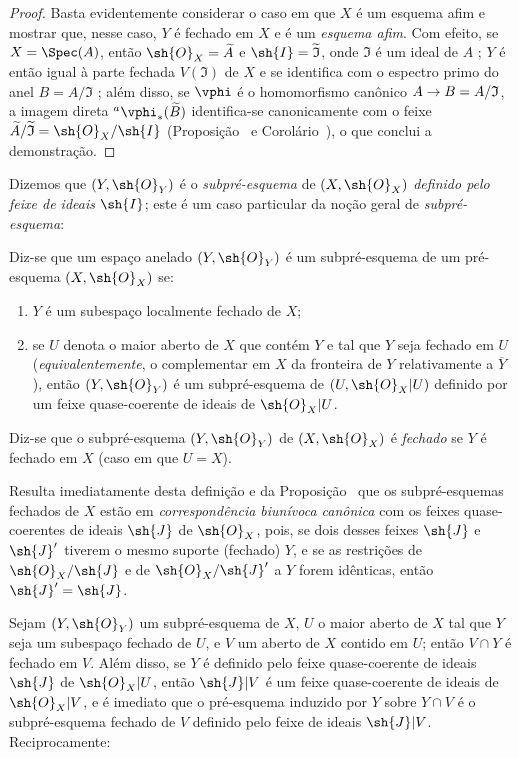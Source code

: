 \documentclass[oneside]{amsart}
\makeatletter
\newcommand{\ega@arrow}[2]{\mathchoice{#1}{#2}{#2}{#2}}
\renewcommand{\to}{\ega@arrow{\longrightarrow}{\rightarrow}}
\newcommand{\oldpage}[2][]{{\marginnote{\normalfont\textbf{#1}~|~#2}}\ignorespaces}
\let\EGAOriginalLabel\label
\renewcommand{\label}[1]{\phantomsection\EGAOriginalLabel{#1}}
\makeatother
\begin{document}
\begin{proof}
\oldpage[I]{120}
Basta evidentemente  considerar o caso em que $X$ é um esquema afim e mostrar que, nesse caso, $Y$ é fechado em $X$ e é um \emph{esquema afim}.
Com efeito, se $X=\Spec(A)$, então $\sh{O}_X=\widetilde{A}$ e $\sh{I}=\widetilde{\mathfrak{I}}$, onde $\mathfrak{I}$ é um ideal de $A$ ;
$Y$ é então igual à parte fechada $V(\mathfrak{I})$ de $X$ e se identifica com o espectro primo do anel $B=A/\mathfrak{I}$ ;
além disso, se $\vphi$ é o homomorfismo canônico $A\to B=A/\mathfrak{I}$, a imagem direta ${}^a\vphi_*(\widetilde{B})$ identifica-se canonicamente com o feixe $\widetilde{A}/\widetilde{\mathfrak{I}}=\sh{O}_X/\sh{I}$ (Proposição~ e Corolário~), o que conclui a demonstração.
\end{proof}

Dizemos que $(Y,\sh{O}_Y)$ é o \emph{subpré-esquema} de $(X,\sh{O}_X)$ \emph{definido pelo feixe de ideais $\sh{I}$};
este é um caso particular da noção geral de \emph{subpré-esquema}:

\begin{definition}[4.1.3]
\label{I.4.1.3}
Diz-se que um espaço anelado $(Y,\sh{O}_Y)$ é um subpré-esquema de um pré-esquema $(X,\sh{O}_X)$ se:
\begin{enumerate}
  \item[1.º] $Y$ é um subespaço localmente fechado de $X$;
  \item[2.º] se $U$ denota o maior aberto de $X$ que contém $Y$ e tal que $Y$ seja fechado em $U$ (\emph{equivalentemente}, o complementar em $X$ da fronteira de $Y$ relativamente a $\overline{Y}$), então $(Y,\sh{O}_Y)$ é um subpré-esquema de $(U,\sh{O}_X|U)$ definido por um feixe quase-coerente de ideais de $\sh{O}_X|U$.
\end{enumerate}
Diz-se que o subpré-esquema $(Y,\sh{O}_Y)$ de $(X,\sh{O}_X)$ é \emph{fechado} se $Y$ é fechado em $X$ (caso em que $U=X$).
\end{definition}

Resulta imediatamente desta definição e da Proposição~ que os subpré-esquemas fechados de $X$ estão em \emph{correspondência biunívoca canônica} com os feixes quase-coerentes de ideais $\sh{J}$ de $\sh{O}_X$, pois, se dois desses feixes $\sh{J}$ e $\sh{J}'$ tiverem o mesmo suporte (fechado) $Y$, e se as restrições de $\sh{O}_X/\sh{J}$ e de $\sh{O}_X/\sh{J}'$ a $Y$ forem idênticas, então $\sh{J}'=\sh{J}$.

\begin{env}[4.1.4]
\label{I.4.1.4}
Sejam $(Y,\sh{O}_Y)$ um subpré-esquema de $X$, $U$ o maior aberto de $X$ tal que $Y$ seja um subespaço fechado de $U$, e $V$ um aberto de $X$ contido em $U$;
então $V\cap Y$ é fechado em $V$.
Além disso, se $Y$ é definido pelo feixe quase-coerente de ideais $\sh{J}$ de $\sh{O}_X|U$, então $\sh{J}|V$ é um feixe quase-coerente de ideais de $\sh{O}_X|V$, e é imediato que o pré-esquema induzido por $Y$ sobre $Y\cap V$ é o subpré-esquema fechado de $V$ definido pelo feixe de ideais $\sh{J}|V$.
Reciprocamente:
\end{env}
\end{document}
